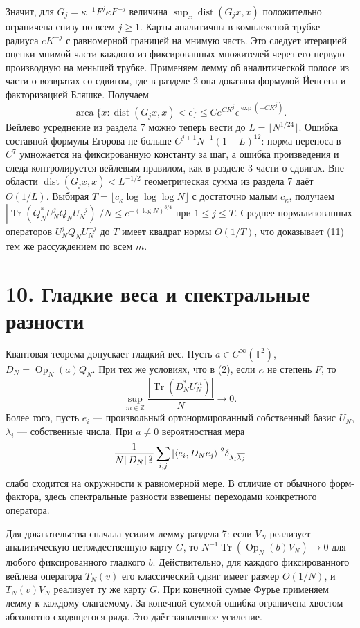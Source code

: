 \documentclass[11pt,a4paper]{article}
\newcommand{\Tr}{\operatorname{Tr}}
\newcommand{\Z}{\mathbb Z}
\newcommand{\sect}[1]{\section*{\sffamily\color{ink}#1}}
\newcommand{\T}{\mathbb T}
\begin{document}
Значит, для $G_j=\kappa^{-1}F^j\kappa F^{-j}$ величина $\sup_x\operatorname{dist}(G_jx,x)$ положительно ограничена снизу по всем $j\ge1$. Карты аналитичны в комплексной трубке радиуса $cK^{-j}$ с равномерной границей на мнимую часть. Это следует итерацией оценки мнимой части каждого из фиксированных множителей через его первую производную на меньшей трубке. Применяем лемму об аналитической полосе из части о возвратах со сдвигом, где в разделе 2 она доказана формулой Йенсена и факторизацией Бляшке. Получаем
\[
 \operatorname{area}\{x:\operatorname{dist}(G_jx,x)<\epsilon\}
       \le C e^{CK^j}\epsilon^{\exp(-CK^j)}.
\]
Вейлево усреднение из раздела 7 можно теперь вести до $L=\lfloor N^{1/24}\rfloor$. Ошибка составной формулы Егорова не больше $C^{j+1}N^{-1}(1+L)^{12}$: норма переноса в $C^7$ умножается на фиксированную константу за шаг, а ошибка произведения и следа контролируется вейлевым правилом, как в разделе 3 части о сдвигах. Вне области $\operatorname{dist}(G_jx,x)<L^{-1/2}$ геометрическая сумма из раздела 7 даёт $O(1/L)$. Выбирая $T=\lfloor c_\kappa\log\log\log N\rfloor$ с достаточно малым $c_\kappa$, получаем $|\Tr(Q_N^*U_N^j Q_N U_N^{-j})|/N\le e^{-(\log N)^{3/4}}$ при $1\le j\le T$. Среднее нормализованных операторов $U_N^j Q_NU_N^{-j}$ до $T$ имеет квадрат нормы $O(1/T)$, что доказывает (11) тем же рассуждением по всем $m$.
\newpage
\sect{10. Гладкие веса и спектральные разности}
Квантовая теорема допускает гладкий вес. Пусть $a\in C^\infty(\T^2)$, $D_N=\operatorname{Op}_N(a)Q_N$. При тех же условиях, что в (2), если $\kappa$ не степень $F$, то
\[
       \sup_{m\in\Z}\frac{|\Tr(D_N^*U_N^m)|}{N}\longrightarrow0.     \tag{12}
\]
Более того, пусть $e_i$ --- произвольный ортонормированный собственный базис $U_N$, $\lambda_i$ --- собственные числа. При $a\ne0$ вероятностная мера
\[
       \frac1{N\|D_N\|_{\rm n}^2}
          \sum_{i,j}|\langle e_i,D_Ne_j\rangle|^2
                                \delta_{\lambda_i\overline{\lambda_j}}
\]
слабо сходится на окружности к равномерной мере. В отличие от обычного форм-фактора, здесь спектральные разности взвешены переходами конкретного оператора.

Для доказательства сначала усилим лемму раздела 7: если $V_N$ реализует аналитическую нетождественную карту $G$, то $N^{-1}\Tr(\operatorname{Op}_N(b)V_N)\to0$ для любого фиксированного гладкого $b$. Действительно, для каждого фиксированного вейлева оператора $T_N(v)$ его классический сдвиг имеет размер $O(1/N)$, и $T_N(v)V_N$ реализует ту же карту $G$. При конечной сумме Фурье применяем лемму к каждому слагаемому. За конечной суммой ошибка ограничена хвостом абсолютно сходящегося ряда. Это даёт заявленное усиление.
\end{document}
